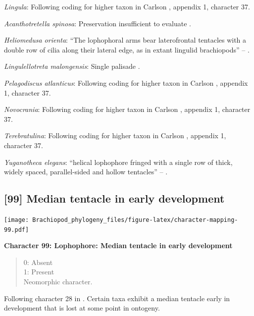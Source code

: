 \documentclass[]{book}
\theoremstyle{definition}
\theoremstyle{definition}
\theoremstyle{definition}
\theoremstyle{remark}
\begin{document}
\emph{Lingula}: Following coding for higher taxon in Carlson
\citeyearpar{Carlson1995Phylogeneticrelationships}, appendix 1,
character 37.

\emph{Acanthotretella spinosa}: Preservation insufficient to evaluate
\citep{Holmer2006Aspinose}.

\emph{Heliomedusa orienta}: ``The lophophoral arms bear laterofrontal
tentacles with a double row of cilia along their lateral edge, as in
extant lingulid brachiopods'' -- \citet{Zhang2009Architectureand}.

\emph{Lingulellotreta malongensis}: Single palisade
\citep{Zhang2004Newdata}.

\emph{Pelagodiscus atlanticus}: Following coding for higher taxon in
Carlson \citeyearpar{Carlson1995Phylogeneticrelationships}, appendix 1,
character 37.

\emph{Novocrania}: Following coding for higher taxon in Carlson
\citeyearpar{Carlson1995Phylogeneticrelationships}, appendix 1,
character 37.

\emph{Terebratulina}: Following coding for higher taxon in Carlson
\citeyearpar{Carlson1995Phylogeneticrelationships}, appendix 1,
character 37.

\emph{Yuganotheca elegans}: ``helical lophophore fringed with a single
row of thick, widely spaced, parallel-sided and hollow tentacles'' --
\citet{Zhang2014Anearly}.

\hypertarget{median-tentacle-in-early-development}{%
\subsection*{{[}99{]} Median tentacle in early
development}\label{median-tentacle-in-early-development}}

\texttt{[image: Brachiopod\_phylogeny\_files/figure-latex/character-mapping-99.pdf]}

\textbf{Character 99: Lophophore: Median tentacle in early development}

\begin{quote}
0: Absent\\
1: Present\\
Neomorphic character.
\end{quote}

Following character 28 in \citet{Carlson1995Phylogeneticrelationships}.
Certain taxa exhibit a median tentacle early in development that is lost
at some point in ontogeny.
\end{document}

